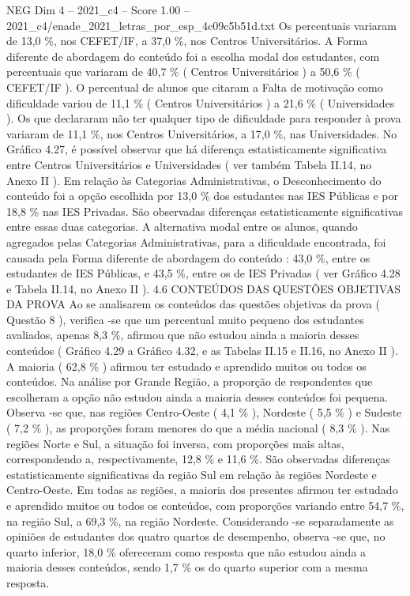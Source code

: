\begin{textsample}{NEG Dim 4 – 2021\_c4 – Score 1.00 – 2021\_c4/enade\_2021\_letras\_por\_esp\_4c09c5b51d.txt}
Os percentuais variaram de 13,0 \%, nos CEFET/IF, a 37,0 \%, nos Centros Universitários.
A Forma diferente de abordagem do conteúdo foi a escolha modal dos estudantes, com percentuais que variaram de 40,7 \% ( Centros Universitários ) a 50,6 \% ( CEFET/IF ).
O percentual de alunos que citaram a Falta de motivação como dificuldade variou de 11,1 \% ( Centros Universitários ) a 21,6 \% ( Universidades ).
Os que declararam não ter qualquer tipo de dificuldade para responder à prova variaram de 11,1 \%, nos Centros Universitários, a 17,0 \%, nas Universidades.
No Gráfico 4.27, é possível observar que há diferença estatisticamente significativa entre Centros Universitários e Universidades ( ver também Tabela II.14, no Anexo II ).
Em relação às Categorias Administrativas, o Desconhecimento do conteúdo foi a opção escolhida por 13,0 \% dos estudantes nas IES Públicas e por 18,8 \% nas IES Privadas.
São observadas diferenças estatisticamente significativas entre essas duas categorias.
A alternativa modal entre os alunos, quando agregados pelas Categorias Administrativas, para a dificuldade encontrada, foi causada pela Forma diferente de abordagem do conteúdo : 43,0 \%, entre os estudantes de IES Públicas, e 43,5 \%, entre os de IES Privadas ( ver Gráfico 4.28 e Tabela II.14, no Anexo II ). 4.6 CONTEÚDOS DAS QUESTÕES OBJETIVAS DA PROVA Ao se analisarem os conteúdos das questões objetivas da prova ( Questão 8 ), verifica -se que um percentual muito pequeno dos estudantes avaliados, apenas 8,3 \%, afirmou que não estudou ainda a maioria desses conteúdos ( Gráfico 4.29 a Gráfico 4.32, e as Tabelas II.15 e II.16, no Anexo II ).
A maioria ( 62,8 \% ) afirmou ter estudado e aprendido muitos ou todos os conteúdos.
Na análise por Grande Região, a proporção de respondentes que escolheram a opção não estudou ainda a maioria desses conteúdos foi pequena.
Observa -se que, nas regiões Centro-Oeste ( 4,1 \% ), Nordeste ( 5,5 \% ) e Sudeste ( 7,2 \% ), as proporções foram menores do que a média nacional ( 8,3 \% ).
Nas regiões Norte e Sul, a situação foi inversa, com proporções mais altas, correspondendo a, respectivamente, 12,8 \% e 11,6 \%.
São observadas diferenças estatisticamente significativas da região Sul em relação às regiões Nordeste e Centro-Oeste.
Em todas as regiões, a maioria dos presentes afirmou ter estudado e aprendido muitos ou todos os conteúdos, com proporções variando entre 54,7 \%, na região Sul, a 69,3 \%, na região Nordeste.
Considerando -se separadamente as opiniões de estudantes dos quatro quartos de desempenho, observa -se que, no quarto inferior, 18,0 \% ofereceram como resposta que não estudou ainda a maioria desses conteúdos, sendo 1,7 \% os do quarto superior com a mesma resposta.

\end{textsample}

